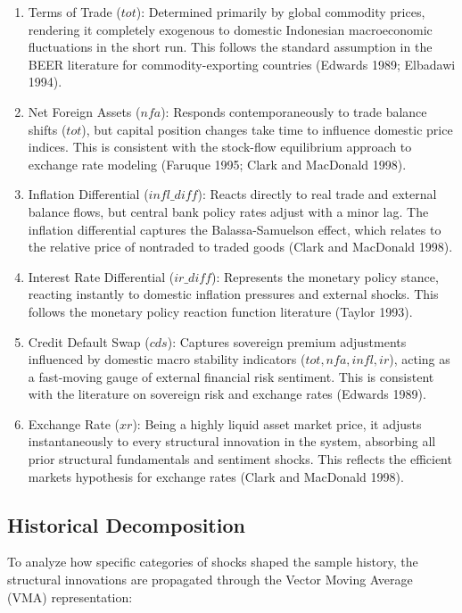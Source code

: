 \documentclass[
  manuscript=article,
  layout=publish,
  year=2026,
  volume=6,
]{den}
\begin{document}
\begin{enumerate}
\def\labelenumi{\arabic{enumi}.}
\item
  Terms of Trade (\(tot\)): Determined primarily by global commodity
  prices, rendering it completely exogenous to domestic Indonesian
  macroeconomic fluctuations in the short run. This follows the standard
  assumption in the BEER literature for commodity-exporting countries
  (Edwards 1989; Elbadawi 1994).
\item
  Net Foreign Assets (\(nfa\)): Responds contemporaneously to trade
  balance shifts (\(tot\)), but capital position changes take time to
  influence domestic price indices. This is consistent with the
  stock-flow equilibrium approach to exchange rate modeling (Faruque
  1995; Clark and MacDonald 1998).
\item
  Inflation Differential (\(infl\_diff\)): Reacts directly to real trade
  and external balance flows, but central bank policy rates adjust with
  a minor lag. The inflation differential captures the Balassa-Samuelson
  effect, which relates to the relative price of nontraded to traded
  goods (Clark and MacDonald 1998).
\item
  Interest Rate Differential (\(ir\_diff\)): Represents the monetary
  policy stance, reacting instantly to domestic inflation pressures and
  external shocks. This follows the monetary policy reaction function
  literature (Taylor 1993).
\item
  Credit Default Swap (\(cds\)): Captures sovereign premium adjustments
  influenced by domestic macro stability indicators
  (\(tot, nfa, infl, ir\)), acting as a fast-moving gauge of external
  financial risk sentiment. This is consistent with the literature on
  sovereign risk and exchange rates (Edwards 1989).
\item
  Exchange Rate (\(xr\)): Being a highly liquid asset market price, it
  adjusts instantaneously to every structural innovation in the system,
  absorbing all prior structural fundamentals and sentiment shocks. This
  reflects the efficient markets hypothesis for exchange rates (Clark
  and MacDonald 1998).
\end{enumerate}

\subsection{Historical Decomposition}\label{historical-decomposition}

To analyze how specific categories of shocks shaped the sample history,
the structural innovations are propagated through the Vector Moving
Average (VMA) representation:
\end{document}
